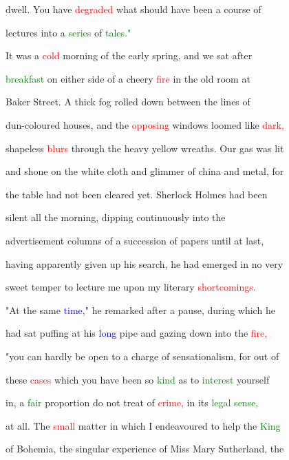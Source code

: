  dwell. You have \textcolor{red}{degraded} what should have been a course of

 lectures into a \textcolor{green}{series} of \textcolor{green}{tales."}



 It was a \textcolor{red}{cold} morning of the early spring, and we sat after

 \textcolor{green}{breakfast} on either side of a \textcolor{BurntOrange}{cheery} \textcolor{red}{fire} in the old room at

 Baker Street. A thick fog rolled down between the lines of

 dun-coloured houses, and the \textcolor{red}{opposing} windows \textcolor{BurntOrange}{loomed} like \textcolor{red}{dark,}

 shapeless \textcolor{red}{blurs} through the heavy yellow wreaths. Our gas was lit

 and shone on the \textcolor{BurntOrange}{white} cloth and \textcolor{BurntOrange}{glimmer} of china and metal, for

 the table had not been cleared yet. Sherlock Holmes had been

 silent all the morning, dipping continuously into the

 advertisement columns of a succession of papers until at last,

 having apparently given up his search, he had emerged in no very

 \textcolor{BurntOrange}{sweet} temper to lecture me upon my literary \textcolor{red}{shortcomings.}



 "At the same \textcolor{blue}{time,"} he remarked after a pause, during which he

 had sat puffing at his \textcolor{blue}{long} pipe and gazing down into the \textcolor{red}{fire,}

 "you can hardly be open to a charge of sensationalism, for out of

 these \textcolor{red}{cases} which you have been so \textcolor{green}{kind} as to \textcolor{green}{interest} yourself

 in, a \textcolor{green}{fair} proportion do not \textcolor{BurntOrange}{treat} of \textcolor{red}{crime,} in its \textcolor{green}{legal} \textcolor{green}{sense,}

 at all. The \textcolor{red}{small} matter in which I endeavoured to help the \textcolor{green}{King}

 of Bohemia, the singular experience of Miss Mary Sutherland, the

